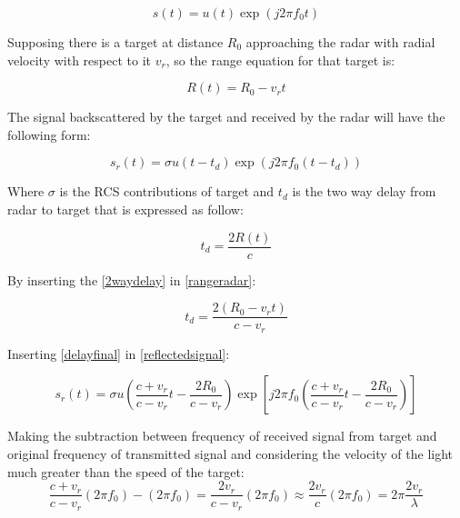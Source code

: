 \begin{equation}
s(t)=u(t) \exp \left(j 2\pi f_{0} t\right)
\end{equation}

Supposing there is a target at distance $R_{0}$ approaching the radar with radial velocity with respect to it $v_{r}$, so the range equation for that target is:

\begin{equation}
R\left(t\right)=R_{0}-v_{r} t
\label{rangeradar}
\end{equation}

The signal backscattered by the target and received by the radar will have the following form:

\begin{equation}
s_{r}(t) =\sigma u\left(t-t_{d}\right) \exp \left(j 2\pi f_{0}\left(t-t_{d}\right)\right)
\label{reflectedsignal}
\end{equation}

Where $\sigma$ is the RCS contributions of target and $t_{d}$ is the two way delay from radar to target that is expressed as follow:

\begin{equation}
t_{d}=\frac{2 R\left(t\right)}{c}
\label{2waydelay}
\end{equation}

By inserting the \ref{2waydelay} in \ref{rangeradar}:

\begin{equation}
t_{d}=\frac{2\left(R_{0}-v_{r} t\right)}{c-v_{r}}
\label{delayfinal}
\end{equation}

Inserting \ref{delayfinal} in \ref{reflectedsignal}:

\begin{equation}
s_{r}(t)=\sigma u\left(\frac{c+v_{r}}{c-v_{r}} t-\frac{2 R_{0}}{c-v_{r}}\right) \exp \left[j 2\pi f_{0}\left(\frac{c+v_{r}}{c-v_{r}} t-\frac{2 R_{0}}{c-v_{r}}\right)\right]
\label{reflectedsigfinal}
\end{equation}

Making the subtraction between frequency of received signal from target and original frequency of transmitted signal and considering the velocity of the light much greater than the speed of the target:
\begin{equation}
\frac{c+v_{r}}{c-v_{r}} (2\pi f_{0})-(2\pi f_{0})=\frac{2 v_{r}}{c-v_{r}} (2\pi f_{0}) \approx \frac{2 v_{r}}{c} (2\pi f_{0})=2 \pi \frac{2 v_{r}}{\lambda}
\end{equation}

